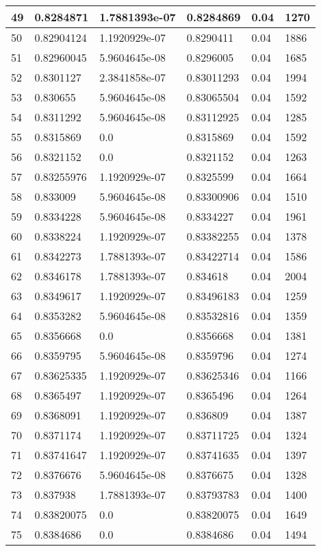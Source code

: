 \begin{longtable}{|l|l|l|l|l|l|}
49 & 0.8284871 & 1.7881393e-07 & 0.8284869 & 0.04 & 1270 \\ \hline 
50 & 0.82904124 & 1.1920929e-07 & 0.8290411 & 0.04 & 1886 \\ \hline 
51 & 0.82960045 & 5.9604645e-08 & 0.8296005 & 0.04 & 1685 \\ \hline 
52 & 0.8301127 & 2.3841858e-07 & 0.83011293 & 0.04 & 1994 \\ \hline 
53 & 0.830655 & 5.9604645e-08 & 0.83065504 & 0.04 & 1592 \\ \hline 
54 & 0.8311292 & 5.9604645e-08 & 0.83112925 & 0.04 & 1285 \\ \hline 
55 & 0.8315869 & 0.0 & 0.8315869 & 0.04 & 1592 \\ \hline 
56 & 0.8321152 & 0.0 & 0.8321152 & 0.04 & 1263 \\ \hline 
57 & 0.83255976 & 1.1920929e-07 & 0.8325599 & 0.04 & 1664 \\ \hline 
58 & 0.833009 & 5.9604645e-08 & 0.83300906 & 0.04 & 1510 \\ \hline 
59 & 0.8334228 & 5.9604645e-08 & 0.8334227 & 0.04 & 1961 \\ \hline 
60 & 0.8338224 & 1.1920929e-07 & 0.83382255 & 0.04 & 1378 \\ \hline 
61 & 0.8342273 & 1.7881393e-07 & 0.83422714 & 0.04 & 1586 \\ \hline 
62 & 0.8346178 & 1.7881393e-07 & 0.834618 & 0.04 & 2004 \\ \hline 
63 & 0.8349617 & 1.1920929e-07 & 0.83496183 & 0.04 & 1259 \\ \hline 
64 & 0.8353282 & 5.9604645e-08 & 0.83532816 & 0.04 & 1359 \\ \hline 
65 & 0.8356668 & 0.0 & 0.8356668 & 0.04 & 1381 \\ \hline 
66 & 0.8359795 & 5.9604645e-08 & 0.8359796 & 0.04 & 1274 \\ \hline 
67 & 0.83625335 & 1.1920929e-07 & 0.83625346 & 0.04 & 1166 \\ \hline 
68 & 0.8365497 & 1.1920929e-07 & 0.8365496 & 0.04 & 1264 \\ \hline 
69 & 0.8368091 & 1.1920929e-07 & 0.836809 & 0.04 & 1387 \\ \hline 
70 & 0.8371174 & 1.1920929e-07 & 0.83711725 & 0.04 & 1324 \\ \hline 
71 & 0.83741647 & 1.1920929e-07 & 0.83741635 & 0.04 & 1397 \\ \hline 
72 & 0.8376676 & 5.9604645e-08 & 0.8376675 & 0.04 & 1328 \\ \hline 
73 & 0.837938 & 1.7881393e-07 & 0.83793783 & 0.04 & 1400 \\ \hline 
74 & 0.83820075 & 0.0 & 0.83820075 & 0.04 & 1649 \\ \hline 
75 & 0.8384686 & 0.0 & 0.8384686 & 0.04 & 1494 \\ \hline 
\end{longtable}